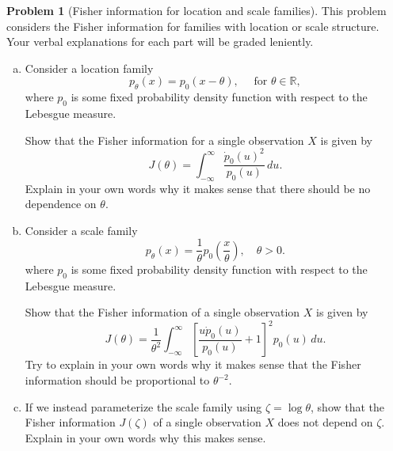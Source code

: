 \documentclass{article}
\newcommand{\RR}{\mathbb{R}}
\theoremstyle{definition}
\newtheorem{problem}{Problem}
\begin{document}
\begin{problem}[Fisher information for location and scale families]

This problem considers the Fisher information for families with location or scale structure. Your verbal explanations for each part will be graded leniently.

\begin{enumerate}[(a)]

\item Consider a location family
\[
p_\theta(x) = p_0(x-\theta), \quad \text{ for } \theta \in \RR,
\]
where $p_0$ is some fixed probability density function with respect to the Lebesgue measure.

Show that the Fisher information for a single observation $X$ is given by
\[
J(\theta) = \int_{-\infty}^\infty \frac{\dot{p}_0(u)^2}{p_0(u)}\,d u.
\]
Explain in your own words why it makes sense that there should be no dependence on $\theta$.



\item Consider a scale family 
\[p_\theta(x) = \frac{1}{\theta}p_0\left(\frac{x}{\theta}\right),\quad \theta > 0.\]
where $p_0$ is some fixed probability density function with respect to the Lebesgue measure.

Show that the Fisher information of a single observation $X$ is given by
\[J(\theta) = \frac{1}{\theta^{2}}\int_{-\infty}^\infty\left[\frac{u \dot{p}_0(u)}{p_0(u)} + 1\right]^{2}p_0(u)\,d u.\]
Try to explain in your own words why it makes sense that the Fisher information should be proportional to $\theta^{-2}$.



\item If we instead parameterize the scale family using $\zeta = \log\theta$, show that the Fisher information $J(\zeta)$ of a single observation $X$ does not depend on $\zeta$. Explain in your own words why this makes sense.



\end{enumerate}
\end{problem}
\end{document}
